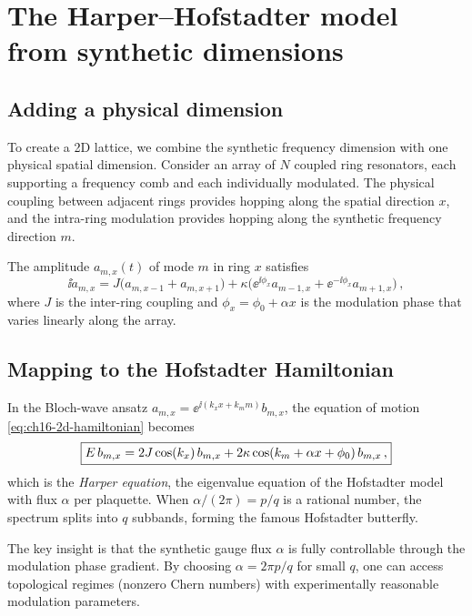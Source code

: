 \section{The Harper--Hofstadter model from synthetic dimensions}
\label{sec:ch16-harper}

\subsection{Adding a physical dimension}
\label{sec:ch16-2d-lattice}

To create a 2D lattice, we combine the synthetic frequency dimension
with one physical spatial dimension.  Consider an array of $N$ coupled
ring resonators, each supporting a frequency comb and each individually
modulated.  The physical coupling between adjacent rings provides
hopping along the spatial direction $x$, and the intra-ring modulation
provides hopping along the synthetic frequency direction $m$.

The amplitude $a_{m,x}(t)$ of mode $m$ in ring $x$ satisfies
\begin{equation}\label{eq:ch16-2d-hamiltonian}
  \ii\dot{a}_{m,x}
  = J\bigl(a_{m,x-1}+a_{m,x+1}\bigr)
  + \kappa\bigl(\ee^{\ii\phi_x}a_{m-1,x}+\ee^{-\ii\phi_x}a_{m+1,x}\bigr)\,,
\end{equation}
where $J$ is the inter-ring coupling and $\phi_x=\phi_0+\alpha x$ is
the modulation phase that varies linearly along the array.

\subsection{Mapping to the Hofstadter Hamiltonian}
\label{sec:ch16-hofstadter}

In the Bloch-wave ansatz $a_{m,x}=\ee^{\ii(k_x x + k_m m)}b_{m,x}$,
the equation of motion \eqref{eq:ch16-2d-hamiltonian} becomes
\cite{ozawa2018topological}
\begin{equation}\label{eq:ch16-hofstadter}
  \boxed{%
  E\,b_{m,x} = 2J\cos(k_x)\,b_{m,x}
  + 2\kappa\cos(k_m+\alpha x+\phi_0)\,b_{m,x}\,,}
\end{equation}
which is the \emph{Harper equation}, the eigenvalue equation of the
Hofstadter model with flux $\alpha$ per plaquette.  When
$\alpha/(2\pi)=p/q$ is a rational number, the spectrum splits into $q$
subbands, forming the famous Hofstadter butterfly.

The key insight is that the synthetic gauge flux $\alpha$ is fully
controllable through the modulation phase gradient.  By choosing
$\alpha=2\pi p/q$ for small $q$, one can access topological regimes
(nonzero Chern numbers) with experimentally reasonable modulation
parameters.


